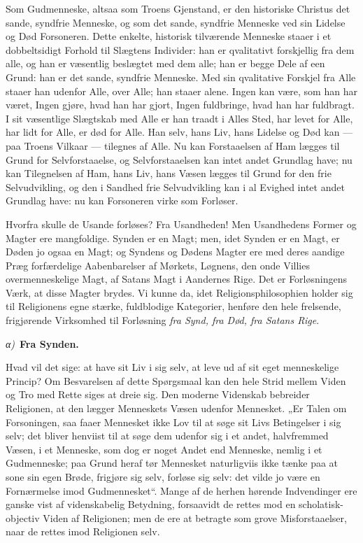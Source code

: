 \documentclass[12pt]{book}
\newcommand{\greekrun}[2]{%
  \medskip\begin{center}{\itshape #1)}\ {\bfseries #2}\end{center}\medskip}
\begin{document}
Som Gudmenneske, altsaa som Troens Gjenstand, er den historiske
Christus det sande, syndfrie Menneske, og som det sande, syndfrie
Menneske ved sin Lidelse og Død Forsoneren. Dette enkelte,
historisk tilværende Menneske staaer i et dobbeltsidigt Forhold til
Slægtens Individer: han er qvalitativt forskjellig fra dem alle, og
han er væsentlig beslægtet med dem alle; han er begge Dele af een
Grund: han er det sande, syndfrie Menneske. Med sin qvalitative
Forskjel fra Alle staaer han udenfor Alle, over Alle; han staaer
alene. Ingen kan være, som han har været, Ingen gjøre, hvad han har
gjort, Ingen fuldbringe, hvad han har fuldbragt. I sit væsentlige
Slægtskab med Alle er han traadt i Alles Sted, har levet for Alle,
har lidt for Alle, er død for Alle. Han selv, hans Liv, hans Lidelse
og Død kan --- paa Troens Vilkaar --- tilegnes af Alle. Nu kan
Forstaaelsen af Ham lægges til Grund for Selvforstaaelse, og
Selvforstaaelsen kan intet andet Grundlag have; nu kan Tilegnelsen
af Ham, hans Liv, hans Væsen lægges til Grund for den frie
Selvudvikling, og den i Sandhed frie Selvudvikling kan i al Evighed
intet andet Grundlag have: nu kan Forsoneren virke som Forløser.

Hvorfra skulle de Usande forløses? Fra Usandheden! Men Usandhedens
Former og Magter ere mangfoldige. Synden er en Magt; men, idet
Synden er en Magt, er Døden jo ogsaa en Magt; og Syndens og Dødens
Magter
ere med deres aandige Præg forfærdelige Aabenbarelser af Mørkets,
Løgnens, den onde Villies overmenneskelige Magt, af Satans Magt i
Aandernes Rige. Det er Forløsningens Værk, at disse Magter brydes.
Vi kunne da, idet Religionsphilosophien holder sig til Religionens
egne stærke, fuldblodige Kategorier, henføre den hele frelsende,
frigjørende Virksomhed til Forløsning \emph{fra Synd, fra Død, fra
Satans Rige}.

\greekrun{α}{Fra Synden.}

Hvad vil det sige: at have sit Liv i sig selv, at leve ud af sit
eget menneskelige Princip? Om Besvarelsen af dette Spørgsmaal kan
den hele Strid mellem Viden og Tro med Rette siges at dreie sig. Den
moderne Videnskab bebreider Religionen, at den lægger Menneskets
Væsen udenfor Mennesket. „Er Talen om Forsoningen, saa faaer
Mennesket ikke Lov til at søge sit Livs Betingelser i sig selv; det
bliver henviist til at søge dem udenfor sig i et andet, halvfremmed
Væsen, i et Menneske, som dog er noget Andet end Menneske, nemlig i
et Gudmenneske; paa Grund heraf tør Mennesket naturligviis ikke
tænke paa at sone sin egen Brøde, frigjøre sig selv, forløse sig
selv: det vilde jo være en Fornærmelse imod Gudmennesket“. Mange af
de herhen hørende Indvendinger ere ganske vist af videnskabelig
Betydning, forsaavidt de rettes mod en scholatisk-objectiv Viden af
Religionen; men de ere at betragte som grove Misforstaaelser, naar
de rettes imod Religionen selv.
\end{document}
